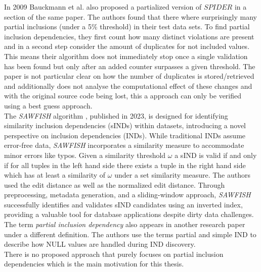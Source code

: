 \noindent In 2009 Bauckmann et al. also proposed a partialized version of $SPIDER$ in a section of the same paper. The authors found that there where surprisingly many partial inclusions (under a 5\% threshold) in their test data sets. To find partial inclusion dependencies, they first count how many distinct violations are present and in a second step consider the amount of duplicates for not included values. This means their algorithm does not immediately stop once a single validation has been found but only after an added counter surpasses a given threshold. The paper is not particular clear on how the number of duplicates is stored/retrieved and additionally does not analyse the computational effect of these changes and with the original source code being lost, this a approach can only be verified using a best guess approach.\\

\noindent The \textit{SAWFISH} algorithm \cite{kaminsky2023discovering}, published in 2023, is designed for identifying similarity inclusion dependencies (sINDs) within datasets, introducing a novel perspective on inclusion dependencies (INDs). While traditional INDs assume error-free data, \textit{SAWFISH} incorporates a similarity measure to accommodate minor errors like typos. Given a similarity threshold $\omega$ a sIND is valid if and only if for all tuples in the left hand side there exists a tuple in the right hand side which has at least a similarity of $\omega$ under a set similarity measure. The authors used the edit distance as well as the normalized edit distance. Through preprocessing, metadata generation, and a sliding-window approach, \textit{SAWFISH} successfully identifies and validates sIND candidates using an inverted index, providing a valuable tool for database applications despite dirty data challenges. \\

\noindent The term \textit{partial inclusion dependency} also appears in another research paper \cite{kohler2015inclusion} under a different definition. The authors use the terms partial and simple IND to describe how NULL values are handled during IND discovery. \\

\noindent There is no proposed approach that purely focuses on partial inclusion dependencies which is the main motivation for this thesis.


